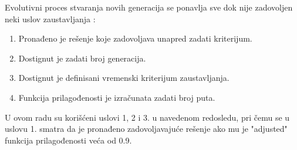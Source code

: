 \documentclass[main.tex]{subfiles}
\begin{document}
Evolutivni proces stvaranja novih generacija se ponavlja sve dok nije zadovoljen neki uslov zaustavljanja \cite{VI}:

\begin{enumerate}
    \item Pronađeno je rešenje koje zadovoljava unapred zadati kriterijum.
    \item Dostignut je zadati broj generacija.
    \item Dostignut je definisani vremenski kriterijum zaustavljanja.
    \item Funkcija prilagođenosti je izračunata zadati broj puta.
\end{enumerate}

U ovom radu su korišćeni uslovi 1, 2 i 3. u navedenom redosledu, pri čemu se u uslovu 1. smatra da je pronađeno zadovoljavajuće rešenje ako mu je "adjusted" funkcija prilagođenosti veća od 0.9. 
\end{document}
